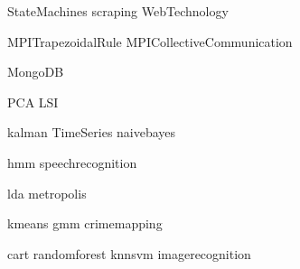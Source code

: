 \documentclass[nociteref]{SIAM-GH-book}
\begin{document}
{StateMachines}
{scraping}
{WebTechnology}

{MPITrapezoidalRule}
{MPICollectiveCommunication}

{MongoDB}

{PCA}
{LSI}

{kalman}
{TimeSeries}
{naivebayes}

{hmm}
{speechrecognition}

{lda}
{metropolis}

{kmeans}
{gmm}
{crimemapping}

{cart}
{randomforest}
{knnsvm}
{imagerecognition}
\end{document}
